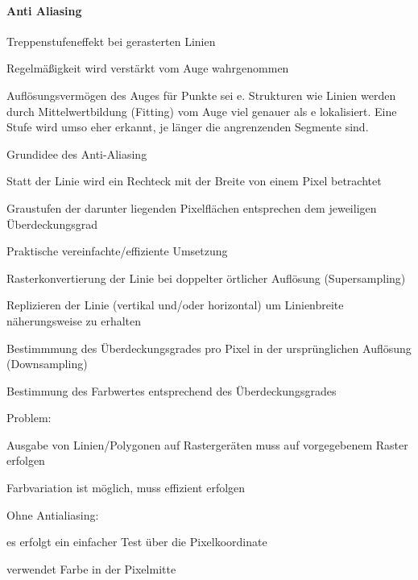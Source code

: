 \documentclass[landscape]{article}
\begin{document}
\begin{multicols}{3}
  \paragraph{Anti Aliasing}
  \begin{itemize*}
    \item Treppenstufeneffekt bei gerasterten Linien
    \item Regelmäßigkeit wird verstärkt vom Auge wahrgenommen
    \item Auflösungsvermögen des Auges für Punkte sei e. Strukturen wie Linien werden durch Mittelwertbildung (Fitting) vom Auge viel genauer als e lokalisiert. Eine Stufe wird umso eher erkannt, je länger die angrenzenden Segmente sind.
    \item Grundidee des Anti-Aliasing
    \begin{itemize*}
      \item Statt der Linie wird ein Rechteck mit der Breite von einem Pixel betrachtet
      \item Graustufen der darunter liegenden Pixelflächen entsprechen dem jeweiligen Überdeckungsgrad
    \end{itemize*}
    \item Praktische vereinfachte/effiziente Umsetzung
    \begin{itemize*}
      \item Rasterkonvertierung der Linie bei doppelter örtlicher Auflösung (Supersampling)
      \item Replizieren der Linie (vertikal und/oder horizontal) um Linienbreite näherungsweise zu erhalten
      \item Bestimmmung des Überdeckungsgrades pro Pixel in der ursprünglichen Auflösung (Downsampling)
      \item Bestimmung des Farbwertes entsprechend des Überdeckungsgrades
    \end{itemize*}
    \item Problem:
    \begin{itemize*}
      \item Ausgabe von Linien/Polygonen auf Rastergeräten muss auf vorgegebenem Raster erfolgen
      \item Farbvariation ist möglich, muss effizient erfolgen
    \end{itemize*}
    \item Ohne Antialiasing:
    \begin{itemize*}
      \item es erfolgt ein einfacher Test über die Pixelkoordinate
      \item verwendet Farbe in der Pixelmitte

\end{itemize*}
\end{itemize*}
\end{multicols}
\end{document}

